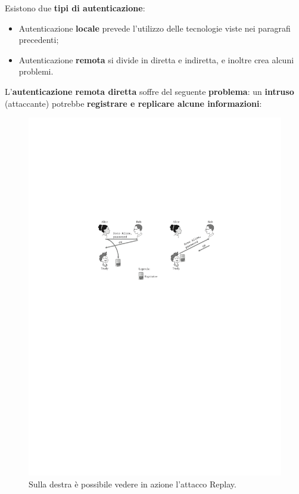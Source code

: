 \documentclass[a4paper]{article}
\begin{document}
	Esistono due \textbf{tipi di autenticazione}:
	\begin{itemize}
		\item Autenticazione \textcolor{Red3}{\textbf{locale}} prevede l'utilizzo delle tecnologie viste nei paragrafi precedenti;
		
		\item Autenticazione \textcolor{Red3}{\textbf{remota}} si divide in diretta e indiretta, e inoltre crea alcuni problemi.
	\end{itemize}
	L'\textcolor{Red3}{\textbf{autenticazione remota diretta}} soffre del seguente \textbf{problema}: un \textbf{intruso} (attaccante) potrebbe \textbf{registrare e replicare alcune informazioni}:
	\begin{figure}[!htp]
		\centering
		\includegraphics[width=\textwidth]{img/int-aut_e_autor/aut-remota_diretta.pdf}
		\caption{Sulla destra è possibile vedere in azione l'attacco Replay.}
	\end{figure}
	
\end{document}
